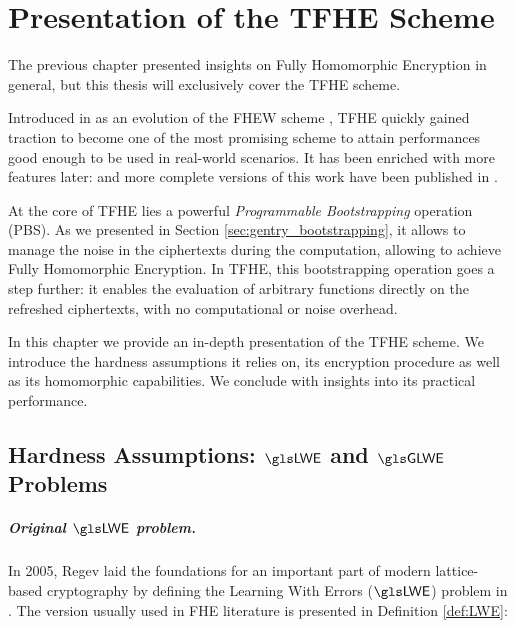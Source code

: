 
\chapter{Presentation of the \gls{TFHE} Scheme}
\label{chap:spec_tfhe}

The previous chapter presented insights on Fully Homomorphic Encryption in general, but this thesis will exclusively cover the \gls{TFHE} scheme.

Introduced in \cite{AC:CGGI16, AC:CGGI17} as an evolution of the FHEW scheme \cite{EC:DucMic15}, \gls{TFHE} quickly gained traction to become one of the most promising scheme to attain performances good enough to be  used in real-world scenarios. It has been enriched with more features later: and more complete versions of this work have been published in \cite{these_chillotti, JC:CGGI20}.

At the core of \gls{TFHE} lies a powerful \textit{Programmable Bootstrapping} operation (\gls{PBS}). As we presented in Section \ref{sec:gentry_bootstrapping}, it allows to manage the noise in the ciphertexts during the computation, allowing to achieve Fully Homomorphic Encryption. In \gls{TFHE}, this bootstrapping operation goes a step further: it enables the evaluation of arbitrary functions directly on the refreshed ciphertexts, with no computational or noise overhead.

In this chapter we provide an in-depth presentation of the \gls{TFHE} scheme. We introduce the hardness assumptions it relies on, its encryption procedure as well as its homomorphic capabilities. We conclude with insights into its practical performance.

\section{Hardness Assumptions: $\LWE$ and $\GLWE$ Problems}
\label{sec:hardness_assumptions}


\paragraph{Original $\LWE$ problem.}

In 2005, Regev laid the foundations for an important part of modern lattice-based cryptography by defining the Learning With Errors ($\LWE$) problem in \cite{STOC:Regev05}. The version usually used in \gls{FHE} literature is presented in Definition \ref{def:LWE}:


